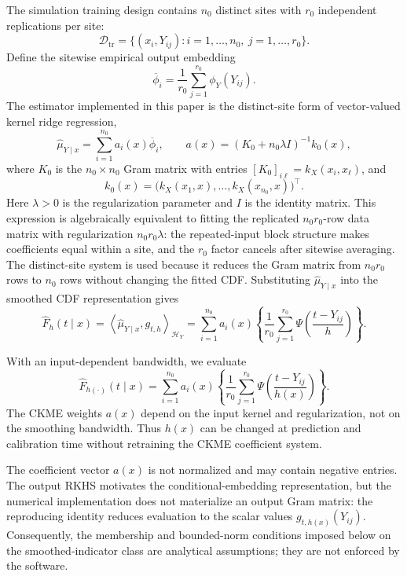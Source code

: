 \documentclass[11pt]{article}
\newcommand{\Hcal}{\mathcal H}
\newcommand{\Dcal}{\mathcal D}
\newcommand{\inner}[2]{\left\langle #1,#2 \right\rangle}
\begin{document}
The simulation training design contains \(n_0\) distinct sites with \(r_0\) independent replications per site:
\[
  \Dcal_{\mathrm{tr}}
  =
  \{(x_i,Y_{ij}):i=1,\ldots,n_0,\ j=1,\ldots,r_0\}.
\]
Define the sitewise empirical output embedding
\[
  \overline\phi_i
  =
  \frac{1}{r_0}\sum_{j=1}^{r_0}\phi_Y(Y_{ij}).
\]
The estimator implemented in this paper is the distinct-site form of vector-valued kernel ridge regression,
\[
  \widehat\mu_{Y\mid x}
  =
  \sum_{i=1}^{n_0}a_i(x)\overline\phi_i,
  \qquad
  a(x)=(K_0+n_0\lambda I)^{-1}k_0(x),
\]
where \(K_0\) is the \(n_0\times n_0\) Gram matrix with entries
\([K_0]_{i\ell}=k_X(x_i,x_\ell)\), and
\[
  k_0(x)=\big(k_X(x_1,x),\ldots,k_X(x_{n_0},x)\big)^\top .
\]
Here \(\lambda>0\) is the regularization parameter and \(I\) is the identity matrix. This expression is algebraically equivalent to fitting the replicated \(n_0r_0\)-row data matrix with regularization \(n_0r_0\lambda\): the repeated-input block structure makes coefficients equal within a site, and the \(r_0\) factor cancels after sitewise averaging. The distinct-site system is used because it reduces the Gram matrix from \(n_0r_0\) rows to \(n_0\) rows without changing the fitted CDF. Substituting \(\widehat\mu_{Y\mid x}\) into the smoothed CDF representation gives
\begin{equation}
  \widehat F_h(t\mid x)=
  \inner{\widehat\mu_{Y\mid x}}{g_{t,h}}_{\Hcal_Y}
  =
  \sum_{i=1}^{n_0}a_i(x)
  \left\{
  \frac{1}{r_0}\sum_{j=1}^{r_0}
  \Psi\!\left(\frac{t-Y_{ij}}{h}\right)
  \right\}.
  \label{eq:ckme-cdf-fixed}
\end{equation}

With an input-dependent bandwidth, we evaluate
\begin{equation}
  \widehat F_{h(\cdot)}(t\mid x)=
  \sum_{i=1}^{n_0}a_i(x)
  \left\{
  \frac{1}{r_0}\sum_{j=1}^{r_0}
  \Psi\!\left(\frac{t-Y_{ij}}{h(x)}\right)
  \right\}.
  \label{eq:ckme-cdf-adaptive}
\end{equation}
The CKME weights \(a(x)\) depend on the input kernel and regularization, not on the smoothing bandwidth. Thus \(h(x)\) can be changed at prediction and calibration time without retraining the CKME coefficient system.

The coefficient vector \(a(x)\) is not normalized and may contain negative
entries. The output RKHS motivates the conditional-embedding representation,
but the numerical implementation does not materialize an output Gram matrix:
the reproducing identity reduces evaluation to the scalar values
\(g_{t,h(x)}(Y_{ij})\). Consequently, the membership and bounded-norm
conditions imposed below on the smoothed-indicator class are analytical
assumptions; they are not enforced by the software.
\end{document}
